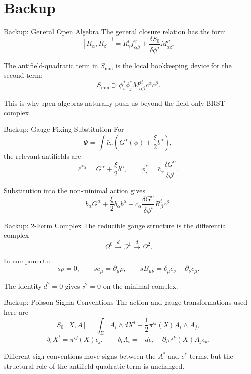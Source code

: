 \documentclass[aspectratio=169,professionalfonts]{beamer}
\begin{document}
\section{Backup}

\begin{frame}{Backup: General Open Algebra}
  \small
  The general closure relation has the form
  \[
    [R_\alpha,R_\beta]^i
    =
    R^i_\gamma f^\gamma_{\alpha\beta}
    +
    \frac{\delta S_0}{\delta\phi^j}M^{ji}_{\alpha\beta}.
  \]

  The antifield-quadratic term in $S_{\min}$ is the local bookkeeping device
  for the second term:
  \[
    S_{\min}\supset
    \phi_i^*\phi_j^*M^{ji}_{\alpha\beta}c^\alpha c^\beta .
  \]

  This is why open algebras naturally push us beyond the field-only BRST
  complex.
\end{frame}

\begin{frame}{Backup: Gauge-Fixing Substitution}
  \small
  For
  \[
    \Psi
    =
    \int \bar c_\alpha
    \left(G^\alpha(\phi)+\frac{\xi}{2}b^\alpha\right),
  \]
  the relevant antifields are
  \[
    \bar c^{*\alpha}
    =G^\alpha+\frac{\xi}{2}b^\alpha,
    \qquad
    \phi_i^*
    =\bar c_\alpha\frac{\delta G^\alpha}{\delta\phi^i}.
  \]

  Substitution into the non-minimal action gives
  \[
    b_\alpha G^\alpha
    +\frac{\xi}{2}b_\alpha b^\alpha
    -\bar c_\alpha
    \frac{\delta G^\alpha}{\delta\phi^i}R^i_\beta c^\beta .
  \]
\end{frame}

\begin{frame}{Backup: 2-Form Complex}
  The reducible gauge structure is the differential complex
  \[
    \Omega^0
    \xrightarrow{\ d\ }
    \Omega^1
    \xrightarrow{\ d\ }
    \Omega^2 .
  \]

  In components:
  \[
    s\rho=0,
    \qquad
    sc_\mu=\partial_\mu\rho,
    \qquad
    sB_{\mu\nu}=\partial_\mu c_\nu-\partial_\nu c_\mu .
  \]

  The identity $d^2=0$ gives $s^2=0$ on the minimal complex.
\end{frame}

\begin{frame}{Backup: Poisson Sigma Conventions}
  \small
  The action and gauge transformations used here are
  \[
    S_0[X,A]
    =\int_\Sigma A_i\wedge dX^i
    +\frac12\pi^{ij}(X)A_i\wedge A_j ,
  \]
  \[
    \delta_\epsilon X^i=\pi^{ij}(X)\epsilon_j,
    \qquad
    \delta_\epsilon A_i
    =-d\epsilon_i-\partial_i\pi^{jk}(X)A_j\epsilon_k .
  \]

  Different sign conventions move signs between the $A^*$ and $c^*$ terms,
  but the structural role of the antifield-quadratic term is unchanged.
\end{frame}
\end{document}
